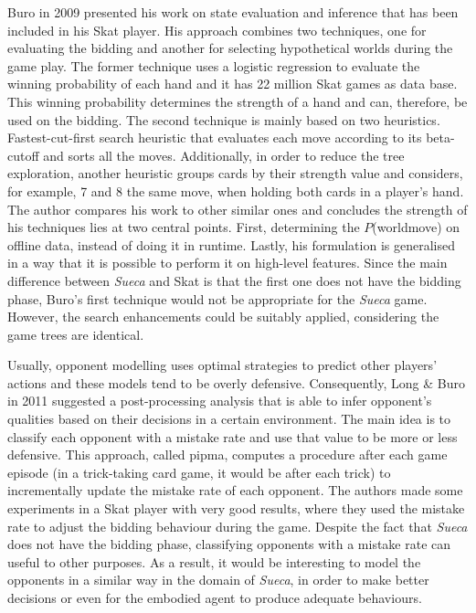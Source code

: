 Buro in 2009 \cite{Buro} presented his work on state evaluation and inference that has been included in his Skat player.
His approach combines two techniques, one for evaluating the bidding and another for selecting hypothetical worlds during the game play.
The former technique uses a logistic regression to evaluate the winning probability of each hand and it has 22 million Skat games as data base.
This winning probability determines the strength of a hand and can, therefore, be used on the bidding.
The second technique is mainly based on two heuristics.
Fastest-cut-first search heuristic that evaluates each move according to its beta-cutoff and sorts all the moves.
Additionally, in order to reduce the tree exploration, another heuristic groups cards by their strength value and considers, for example, 7 and 8 the same move, when holding both cards in a player's hand.
The author compares his work to other similar ones and concludes the strength of his techniques lies at two central points.
First, determining the $P$(world\textbar move) on offline data, instead of doing it in runtime.
Lastly, his formulation is generalised in a way that it is possible to perform it on high-level features.
Since the main difference between \emph{Sueca} and Skat is that the first one does not have the bidding phase, Buro's first technique would not be appropriate for the \emph{Sueca} game.
However, the search enhancements could be suitably applied, considering the game trees are identical.


Usually, opponent modelling uses optimal strategies to predict other players' actions and these models tend to be overly defensive.
Consequently, Long \& Buro in 2011 \cite{Long2009} suggested a post-processing analysis that is able to infer opponent's qualities based on their decisions in a certain environment.
The main idea is to classify each opponent with a mistake rate and use that value to be more or less defensive.
This approach, called \gls{pipma}, computes a procedure after each game episode (in a trick-taking card game, it would be after each trick) to incrementally update the mistake rate of each opponent.
The authors made some experiments in a Skat player with very good results, where they used the mistake rate to adjust the bidding behaviour during the game.
Despite the fact that \emph{Sueca} does not have the bidding phase, classifying opponents with a mistake rate can useful to other purposes.
As a result, it would be interesting to model the opponents in a similar way in the domain of \emph{Sueca}, in order to make better decisions or even for the embodied agent to produce adequate behaviours.

